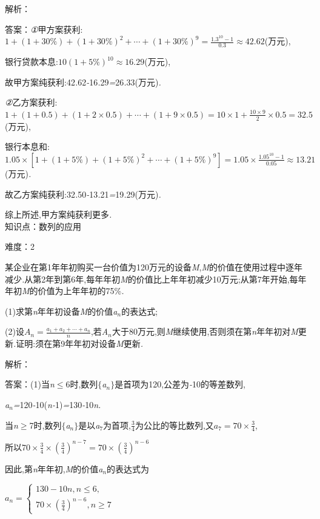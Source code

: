 \documentclass{article} %
\begin{document}
解析：

 答案：\textit{①}甲方案获利:$1+(1+30\%)+(1+30\%)^2+\cdots+(1+30\%)^9=\frac{1.3^{10}-1}{0.3}\approx 42.62$(万元),

银行贷款本息:$10(1+5\%)^{10}\approx 16.29$(万元),

故甲方案纯获利:42\textit{.}62\textit{-}16\textit{.}29\textit{=}26\textit{.}33(万元)\textit{.}

\textit{②}乙方案获利:$1+(1+0.5)+(1+2\times 0.5)+\cdots +(1+9\times 0.5)=10\times 1+\frac{10\times 9}{2}\times 0.5=32.5$(万元),

银行本息和:$1.05\times [1+(1+5\%)+(1+5\%)^2+\cdots+(1+5\%)^9]=1.05\times \frac{1.05^{10}-1}{0.05}\approx 13.21$(万元)\textit{.}

故乙方案纯获利:32\textit{.}50\textit{-}13\textit{.}21\textit{=}19\textit{.}29(万元)\textit{.}

综上所述,甲方案纯获利更多\textit{.} \\

知识点：数列的应用

难度：2

 某企业在第1年年初购买一台价值为120万元的设备\textit{M},\textit{M}的价值在使用过程中逐年减少\textit{.}从第2年到第6年,每年年初\textit{M}的价值比上年年初减少10万元;从第7年开始,每年年初\textit{M}的价值为上年年初的75\%\textit{.}

 (1)求第\textit{n}年年初设备\textit{M}的价值\textit{a${}_{n}$}的表达式;

 (2)设$A_n=\frac{a_1+a_2+\cdots+a_n}{n}$,若\textit{A${}_{n}$}大于80万元,则\textit{M}继续使用,否则须在第\textit{n}年年初对\textit{M}更新\textit{.}证明:须在第9年年初对设备\textit{M}更新\textit{.}

解析：

 答案：(1)当\textit{n}$\mathrm{\le}$6时,数列$\mathrm{\{}$\textit{a${}_{n}$}$\mathrm{\}}$是首项为120,公差为\textit{-}10的等差数列,

\textit{a${}_{n}$=}120\textit{-}10(\textit{n-}1)\textit{=}130\textit{-}10\textit{n.}

当\textit{n}$\mathrm{\ge}$7时,数列$\mathrm{\{}$\textit{a${}_{n}$}$\mathrm{\}}$是以\textit{a}${}_{7}$为首项,$\frac{3}{4}$为公比的等比数列,又$a_7=70\times \frac{3}{4}$,

所以$70\times \frac{3}{4}\times (\frac{3}{4})^{n-7}=70\times (\frac{3}{4})^{n-6}$

因此,第\textit{n}年年初,\textit{M}的价值\textit{a${}_{n}$}的表达式为

$a_n=\left\{
\begin{array}{l}
130-10n, n\le 6, \\
70\times (\frac{3}{4})^{n-6}, n\ge7
\end{array}
\right.$
\end{document}
